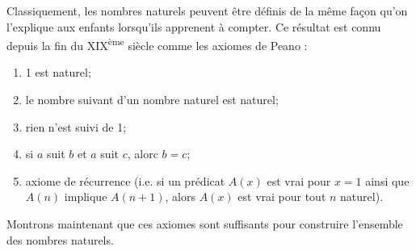 Classiquement, les nombres naturels peuvent être définis de la même façon qu'on l'explique aux enfants lorsqu'ils apprenent à compter. Ce résultat est connu depuis la fin du XIX\textsuperscript{ème} siècle comme les axiomes de Peano :
\begin{enumerate}
	\item 1 est naturel;
	\item le nombre suivant d'un nombre naturel est naturel;
	\item rien n'est suivi de 1;
	\item si $a$ suit $b$ et $a$ suit $c$, alorc $b=c$;
	\item axiome de récurrence (i.e. si un prédicat $A(x)$ est vrai pour $x=1$ ainsi que $A(n)$ implique $A(n+1)$, alors $A(x)$ est vrai pour tout $n$ naturel).
\end{enumerate}
Montrons maintenant que ces axiomes sont suffisants pour construire l'ensemble des nombres naturels.
